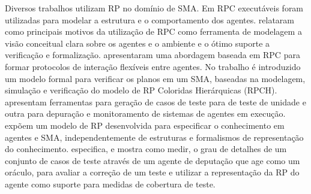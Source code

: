 Diversos trabalhos utilizam RP no domínio de SMA. Em \cite{kohler2001modelling} RPC executáveis foram utilizadas para modelar a estrutura e o comportamento dos agentes. \citet{weyns2002colored} relataram como principais motivos da utilização de RPC como ferramenta de modelagem a visão conceitual clara sobre os agentes e o ambiente e o ótimo suporte a verificação e formalização. \cite{bai2004colored} apresentaram uma abordagem baseada em RPC para formar protocolos de interação flexíveis entre agentes. No trabalho \cite{de2004formal} é introduzido um modelo formal para verificar os planos em um SMA, baseadas na modelagem, simulação e verificação do modelo de RP Coloridas Hierárquicas (RPCH). \cite{poutakidis2009debugging} apresentam ferramentas para geração de casos de teste para de teste de unidade e outra para depuração e monitoramento de sistemas de agentes em execução. \citet{goncalves2010approach} expõem um modelo de RP desenvolvida para especificar o conhecimento em agentes e SMA, independentemente de estruturas e formalismos de representação do conhecimento. \cite{miller2011test} especifica, e mostra como medir, o grau de detalhes de um conjunto de casos de teste através de um agente de deputação que age como um oráculo, para avaliar a correção de um teste e utilizar a representação da RP do agente como suporte para medidas de cobertura de teste.





























